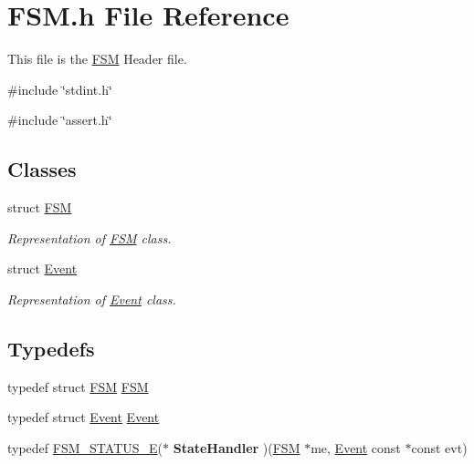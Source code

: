 \section{FSM.h File Reference}
\label{_f_s_m_8h}


This file is the \hyperlink{struct_f_s_m}{FSM} Header file.  


{\ttfamily \#include \char`\"{}stdint.h\char`\"{}}\par
{\ttfamily \#include \char`\"{}assert.h\char`\"{}}\par
\subsection*{Classes}
\begin{DoxyCompactItemize}
\item 
struct \hyperlink{struct_f_s_m}{FSM}
\begin{DoxyCompactList}\small\item\em Representation of \hyperlink{struct_f_s_m}{FSM} class. \end{DoxyCompactList}\item 
struct \hyperlink{struct_event}{Event}
\begin{DoxyCompactList}\small\item\em Representation of \hyperlink{struct_event}{Event} class. \end{DoxyCompactList}\end{DoxyCompactItemize}
\subsection*{Typedefs}
\begin{DoxyCompactItemize}
\item 
typedef struct \hyperlink{struct_f_s_m}{FSM} \hyperlink{group___f_s_m_ga04808fa7704cea8244305a3ddc4ee907}{FSM}
\item 
typedef struct \hyperlink{struct_event}{Event} \hyperlink{group___f_s_m_ga607b119a19e65e2c1c7a606f21ab7a46}{Event}
\item 
typedef \hyperlink{group___f_s_m_ga64d3de8a4121adac058d8a5e116d9b7d}{FSM\_\-STATUS\_\-E}($\ast$ {\bfseries StateHandler} )(\hyperlink{struct_f_s_m}{FSM} $\ast$me, \hyperlink{struct_event}{Event} const $\ast$const evt)\label{group___f_s_m_ga1be99a3de151db40e2cd62ead060424c}

\end{DoxyCompactItemize}
